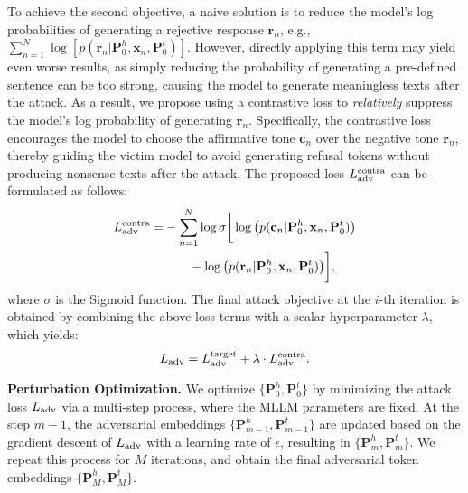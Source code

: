 To achieve the second objective, a naive solution is to reduce the model's log probabilities of generating a rejective response $\mathbf{r}_n$, e.g., 
$\sum_{n=1}^{N}\log[p(\mathbf{r}_{n}|\mathbf{P}_{0}^{h}, \mathbf{x}_n, \mathbf{P}_{0}^{t})]$. However, directly applying this term may yield even worse results, as simply reducing the probability of generating a pre-defined sentence can be too strong, causing the model to generate meaningless texts after the attack. 
As a result, we propose using a contrastive loss to \textit{relatively} suppress the model's log probability of generating $\mathbf{r}_n$.
Specifically, the contrastive loss encourages the model to choose the affirmative tone $\mathbf{c}_n$ over the negative tone $\mathbf{r}_n$, thereby guiding the victim model to avoid generating refusal tokens without producing nonsense texts after the attack. The proposed loss $L_{\rm adv}^{\rm contra}$ can be formulated as follows:
\begin{align}\label{eq:2}
    L_{\rm adv}^{\rm contra} = 
    & -\sum_{n=1}^{N} \log \sigma \bigg[ \log \big( p(\mathbf{c}_{n}|\mathbf{P}_{0}^{h}, \mathbf{x}_n, \mathbf{P}_{0}^{t}) \big) \notag \\
    & \hspace{2em} - \log \big( p(\mathbf{r}_{n}|\mathbf{P}_{0}^{h}, \mathbf{x}_n, \mathbf{P}_{0}^{t}) \big) \bigg],
\end{align}
where $\sigma$ is the Sigmoid function. The final attack objective at the $i$-th iteration is obtained by combining the above loss terms with a scalar hyperparameter $\lambda$, which yields: 
\begin{equation}\label{eq:3}
    L_{\rm adv}= L_{\rm adv}^{\rm target}+\lambda \cdot L_{\rm adv}^{\rm contra}.
\end{equation}

\textbf{Perturbation Optimization.} We optimize $\{\mathbf{P}_0^{h}, \mathbf{P}_0^{t}\}$ by minimizing the attack loss $L_{\rm adv}$ via a multi-step process, where the MLLM parameters are fixed. At the step $m-1$, the adversarial embeddings $\{\mathbf{P}_{m-1}^{h}, \mathbf{P}_{m-1}^{t}\}$ are updated based on the gradient descent of $L_{\rm adv}$ with a learning rate of $\epsilon$, resulting in $\{\mathbf{P}_{m}^{h}, \mathbf{P}_{m}^{t}\}$. We repeat this process for $M$ iterations, and obtain the final adversarial token embeddings $\{\mathbf{P}_{M}^h, \mathbf{P}_{M}^t\}$.


